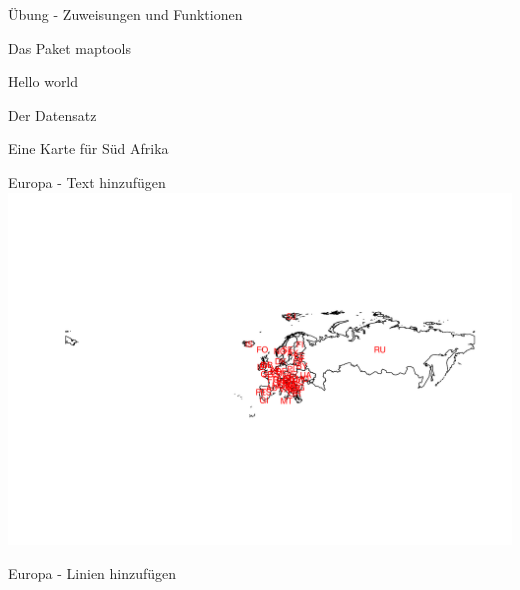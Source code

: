 \documentclass[ignorenonframetext,]{beamer}
\newenvironment{Shaded}{\begin{snugshade}}{\end{snugshade}}
\newcommand{\CommentTok}[1]{\textcolor[rgb]{0.00,0.40,1.00}{\textbf{\textit{#1}}}}
\newcommand{\DataTypeTok}[1]{\textcolor[rgb]{0.74,0.68,0.62}{\underline{#1}}}
\newcommand{\DecValTok}[1]{\textcolor[rgb]{0.27,0.67,0.26}{#1}}
\newcommand{\KeywordTok}[1]{\textcolor[rgb]{0.26,0.66,0.93}{\textbf{#1}}}
\newcommand{\NormalTok}[1]{\textcolor[rgb]{0.74,0.68,0.62}{#1}}
\newcommand{\OperatorTok}[1]{\textcolor[rgb]{0.74,0.68,0.62}{#1}}
\newcommand{\StringTok}[1]{\textcolor[rgb]{0.02,0.61,0.04}{#1}}
\begin{document}
\begin{frame}[fragile]{Übung - Zuweisungen und Funktionen}
\begin{frame}[fragile]{Das Paket maptools}
\begin{frame}[fragile]{Hello world}
\begin{frame}[fragile]{Der Datensatz}
\begin{frame}[fragile]{Eine Karte für Süd Afrika}
\begin{frame}[fragile]{Europa - Text hinzufügen}
\includegraphics{Geomedizin_files/figure-beamer/unnamed-chunk-86-1.pdf}

\end{frame}

\begin{frame}[fragile]{Europa - Linien hinzufügen}
\protect\hypertarget{europa---linien-hinzufugen}{}

\begin{Shaded}
\end{Shaded}

\begin{Shaded}
\end{Shaded}


\end{frame}
\end{frame}
\end{frame}
\end{frame}
\end{frame}
\end{frame}
\end{document}
